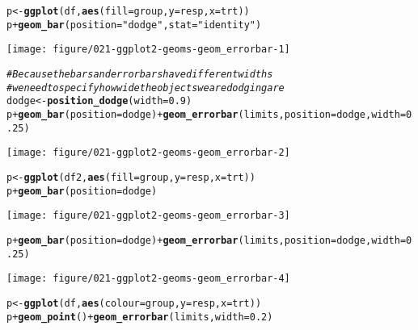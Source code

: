 \documentclass[a4paper,titlepage]{tufte-handout}\usepackage[]{graphicx}\usepackage[]{color}
\makeatletter
\def\maxwidth{ %
  \ifdim\Gin@nat@width>\linewidth
    \linewidth
  \else
    \Gin@nat@width
  \fi
}
\newcommand{\hlnum}[1]{\textcolor[rgb]{0.686,0.059,0.569}{#1}}%
\newcommand{\hlstr}[1]{\textcolor[rgb]{0.192,0.494,0.8}{#1}}%
\newcommand{\hlcom}[1]{\textcolor[rgb]{0.678,0.584,0.686}{\textit{#1}}}%
\newcommand{\hlopt}[1]{\textcolor[rgb]{0,0,0}{#1}}%
\newcommand{\hlstd}[1]{\textcolor[rgb]{0.345,0.345,0.345}{#1}}%
\newcommand{\hlkwb}[1]{\textcolor[rgb]{0.69,0.353,0.396}{#1}}%
\newcommand{\hlkwc}[1]{\textcolor[rgb]{0.333,0.667,0.333}{#1}}%
\newcommand{\hlkwd}[1]{\textcolor[rgb]{0.737,0.353,0.396}{\textbf{#1}}}%
\newenvironment{kframe}{%
 \def\at@end@of@kframe{}%
 \ifinner\ifhmode%
  \def\at@end@of@kframe{\end{minipage}}%
  \begin{minipage}{\columnwidth}%
 \fi\fi%
 \def\FrameCommand##1{\hskip\@totalleftmargin \hskip-\fboxsep
 \colorbox{shadecolor}{##1}\hskip-\fboxsep
     \hskip-\linewidth \hskip-\@totalleftmargin \hskip\columnwidth}%
 \MakeFramed {\advance\hsize-\width
   \@totalleftmargin\z@ \linewidth\hsize
   \@setminipage}}%
 {\par\unskip\endMakeFramed%
 \at@end@of@kframe}
\newenvironment{knitrout}{}{} %
\makeatother
\begin{document}
\begin{knitrout}
\begin{kframe}
\begin{alltt}
\hlstd{p} \hlkwb{<-} \hlkwd{ggplot}\hlstd{(df,} \hlkwd{aes}\hlstd{(}\hlkwc{fill}\hlstd{=group,} \hlkwc{y}\hlstd{=resp,} \hlkwc{x}\hlstd{=trt))}
\hlstd{p} \hlopt{+} \hlkwd{geom_bar}\hlstd{(}\hlkwc{position}\hlstd{=}\hlstr{"dodge"}\hlstd{,} \hlkwc{stat}\hlstd{=}\hlstr{"identity"}\hlstd{)}
\end{alltt}
\end{kframe}
\texttt{[image: figure/021-ggplot2-geoms-geom\_errorbar-1]} 
\begin{kframe}\begin{alltt}
\hlcom{# Because the bars and errorbars have different widths}
\hlcom{# we need to specify how wide the objects we are dodging are}
\hlstd{dodge} \hlkwb{<-} \hlkwd{position_dodge}\hlstd{(}\hlkwc{width}\hlstd{=}\hlnum{0.9}\hlstd{)}
\hlstd{p} \hlopt{+} \hlkwd{geom_bar}\hlstd{(}\hlkwc{position}\hlstd{=dodge)} \hlopt{+} \hlkwd{geom_errorbar}\hlstd{(limits,} \hlkwc{position}\hlstd{=dodge,} \hlkwc{width}\hlstd{=}\hlnum{0.25}\hlstd{)}
\end{alltt}
\end{kframe}
\texttt{[image: figure/021-ggplot2-geoms-geom\_errorbar-2]} 
\begin{kframe}\begin{alltt}
\hlstd{p} \hlkwb{<-} \hlkwd{ggplot}\hlstd{(df2,} \hlkwd{aes}\hlstd{(}\hlkwc{fill}\hlstd{=group,} \hlkwc{y}\hlstd{=resp,} \hlkwc{x}\hlstd{=trt))}
\hlstd{p} \hlopt{+} \hlkwd{geom_bar}\hlstd{(}\hlkwc{position}\hlstd{=dodge)}
\end{alltt}
\end{kframe}
\texttt{[image: figure/021-ggplot2-geoms-geom\_errorbar-3]} 
\begin{kframe}\begin{alltt}
\hlstd{p} \hlopt{+} \hlkwd{geom_bar}\hlstd{(}\hlkwc{position}\hlstd{=dodge)} \hlopt{+} \hlkwd{geom_errorbar}\hlstd{(limits,} \hlkwc{position}\hlstd{=dodge,} \hlkwc{width}\hlstd{=}\hlnum{0.25}\hlstd{)}
\end{alltt}
\end{kframe}
\texttt{[image: figure/021-ggplot2-geoms-geom\_errorbar-4]} 
\begin{kframe}\begin{alltt}
\hlstd{p} \hlkwb{<-} \hlkwd{ggplot}\hlstd{(df,} \hlkwd{aes}\hlstd{(}\hlkwc{colour}\hlstd{=group,} \hlkwc{y}\hlstd{=resp,} \hlkwc{x}\hlstd{=trt))}
\hlstd{p} \hlopt{+} \hlkwd{geom_point}\hlstd{()} \hlopt{+} \hlkwd{geom_errorbar}\hlstd{(limits,} \hlkwc{width}\hlstd{=}\hlnum{0.2}\hlstd{)}
\end{alltt}

\end{kframe}
\end{knitrout}
\end{document}
